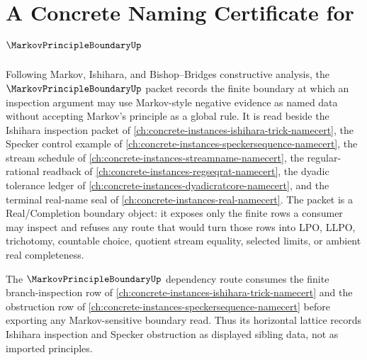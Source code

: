 \chapter{A Concrete Naming Certificate for $\MarkovPrincipleBoundaryUp$}
\label{ch:concrete-instances-markov-principle-boundary-namecert}

Following Markov, Ishihara, and Bishop--Bridges constructive analysis, the $\MarkovPrincipleBoundaryUp$ packet records the finite boundary at which an inspection argument may use Markov-style negative evidence as named data without accepting Markov's principle as a global rule. It is read beside the Ishihara inspection packet of \autoref{ch:concrete-instances-ishihara-trick-namecert}, the Specker control example of \autoref{ch:concrete-instances-speckersequence-namecert}, the stream schedule of \autoref{ch:concrete-instances-streamname-namecert}, the regular-rational readback of \autoref{ch:concrete-instances-regseqrat-namecert}, the dyadic tolerance ledger of \autoref{ch:concrete-instances-dyadicratcore-namecert}, and the terminal real-name seal of \autoref{ch:concrete-instances-real-namecert}. The packet is a Real/Completion boundary object: it exposes only the finite rows a consumer may inspect and refuses any route that would turn those rows into LPO, LLPO, trichotomy, countable choice, quotient stream equality, selected limits, or ambient real completeness.

The $\MarkovPrincipleBoundaryUp$ dependency route consumes the finite branch-inspection row of \autoref{ch:concrete-instances-ishihara-trick-namecert} and the obstruction row of \autoref{ch:concrete-instances-speckersequence-namecert} before exporting any Markov-sensitive boundary read. Thus its horizontal lattice records Ishihara inspection and Specker obstruction as displayed sibling data, not as imported principles.

